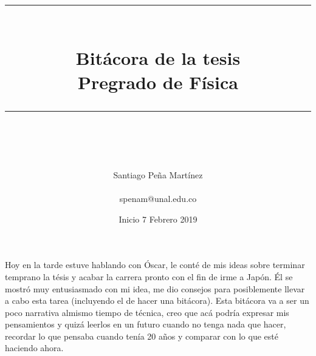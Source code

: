 \documentclass[idxtotoc,hyperref,openany]{labbook} %
\newcommand{\HRule}{\rule{\linewidth}{0.5mm}} %
\begin{document}

\frontmatter %
\title{
\begin{center}
\HRule \\[0.4cm]
{\Huge \bfseries Bitácora de la tesis \\[0.5cm] \Large Pregrado de Física}\\[0.4cm] %
\HRule \\[1.5cm]
\end{center}
}
\author{\Huge Santiago Peña Martínez \\ \\ \LARGE spenam@unal.edu.co \\[2cm]} %
\date{Inicio 7 Febrero 2019} %
\maketitle

\tableofcontents

\mainmatter %












Hoy en la tarde estuve hablando con Óscar, le conté de mis ideas sobre terminar temprano la tésis y acabar la carrera pronto con el fin de irme a Japón. Él se mostró muy entusiasmado con mi idea, me dio consejos para posiblemente llevar a cabo esta tarea (incluyendo el de hacer una bitácora). Esta bitácora va a ser un poco narrativa almismo tiempo de técnica, creo que acá podría expresar mis pensamientos y quizá leerlos en un futuro cuando no tenga nada que hacer, recordar lo que pensaba cuando tenía 20 años y comparar con lo que esté haciendo ahora.\par
\end{document}
